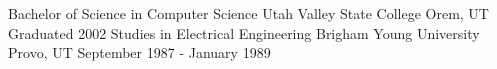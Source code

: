 

\begin{cventries}

  \cventry
    {Bachelor of Science in Computer Science} %
    {Utah Valley State College} %
    {Orem, UT} %
    {Graduated 2002} %
    {
    }
  \cventry
  {Studies in Electrical Engineering} %
  {Brigham Young University} %
  {Provo, UT} %
  {September 1987 - January 1989} %
      {
      }
\end{cventries}
